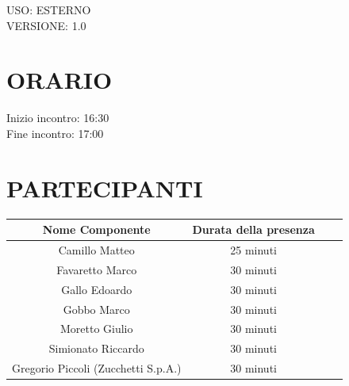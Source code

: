 \documentclass[5pt]{article}
\begin{document}
\begin{flushright}
    \begin{spacing}{1}
        USO: ESTERNO\\
        VERSIONE: 1.0\\
    \end{spacing}
\end{flushright}


\restoregeometry

\pagebreak


\section{ORARIO}
\begin{spacing}{1.5}
    {\large Inizio incontro: 16:30}\\
    {\large Fine incontro: 17:00} 
\end{spacing}

\section{PARTECIPANTI}
\setlength\cellspacetoplimit{6pt}
\setlength\cellspacebottomlimit{6pt}

\begin{table}[ht]
  \begin{tabular}{|Sc|Sc|}
    \hline
    \textbf{Nome Componente} & \textbf{Durata della presenza} \\
    \hline
    Camillo Matteo & 25 minuti \\
    Favaretto Marco & 30 minuti \\
    Gallo Edoardo & 30 minuti \\
    Gobbo Marco & 30 minuti \\
    Moretto Giulio & 30 minuti \\
    Simionato Riccardo & 30 minuti \\
    Gregorio Piccoli (Zucchetti S.p.A.) & 30 minuti \\
    \hline
  \end{tabular}
  \label{tab:conference}
\end{table}
\end{document}

